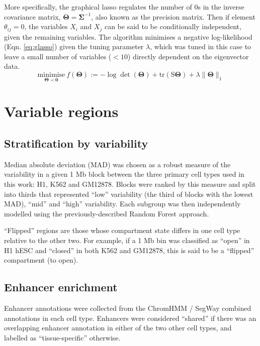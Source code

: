\documentclass[a4paper,10pt,oneside]{book}
\begin{document}
More specifically, the graphical lasso regulates the number of 0s in
the inverse covariance matrix, $\bm{\Theta}=\bm{\Sigma}^{-1}$, also known as the
precision matrix. Then if element $\theta_{ij}=0$, the variables $X_i$ and $X_j$ can be said to be
conditionally independent, given the remaining
variables.\cite{Mazumder2012} The algorithm minimises a negative
log-likelihood (Eqn. \ref{eq:glasso}\cite{Mazumder2012}) given the tuning parameter $\lambda$, which was tuned
in this case to leave a small number of variables ($<10$)
directly dependent on the eigenvector data. \\
\begin{equation} \label{eq:glasso}
\underset{\bm{\Theta}\prec\bm{0}}{\mathrm{minimise}}~f(\bm{\Theta}) :=
-\log\det(\bm{\Theta}) + \mathrm{tr}(\bm{\mathrm{S}\Theta}) + \lambda
\lVert\bm{\Theta}\rVert_1
\end{equation}

\section{Variable regions}\label{variable-regions}

\subsection{Stratification by
variability}\label{stratification-by-variability}

Median absolute deviation (MAD) was chosen as a robust measure of the
variability in a given 1 Mb block between the three primary cell types
used in this work: H1, K562 and GM12878. Blocks were ranked by this
measure and split into thirds that represented ``low'' variability (the
third of blocks with the lowest MAD), ``mid'' and ``high'' variability.
Each subgroup was then independently modelled using the
previously-described Random Forest approach.

``Flipped'' regions are those whose compartment state differs in one
cell type relative to the other two. For example, if a 1 Mb bin was
classified as ``open'' in H1 hESC and ``closed'' in both K562 and
GM12878, this is said to be a ``flipped'' compartment (to open).

\subsection{Enhancer enrichment}\label{enhancer-enrichment}

Enhancer annotations were collected from the ChromHMM / SegWay combined
annotations in each cell type.\citep{Hoffman2013} Enhancers were
considered ``shared'' if there was an overlapping enhancer annotation in
either of the two other cell types, and labelled as ``tissue-specific''
otherwise.
\end{document}
